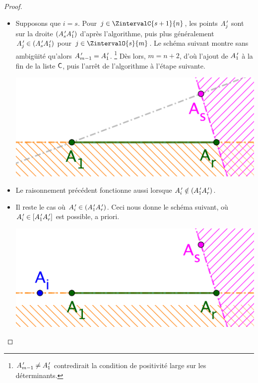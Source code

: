 \begin{proof}
\begin{itemize}
        \item Supposons que $i = s$. 
        Pour $j \in \ZintervalC{s+1}{n}$, les points $A^{\,\prime}_j$ sont sur la droite $( A^{\,\prime}_s A^{\,\prime}_1)$ d'après l'algorithme, 
        puis plus généralement $A^{\,\prime}_j \in ( A^{\,\prime}_s A^{\,\prime}_1)$ pour $j \in \ZintervalO{s}{m}$. 
        Le schéma suivant montre sans ambigüité qu'alors
        $A^{\,\prime}_{m-1} = A^{\,\prime}_1$.%
        \footnote{
            $A^{\,\prime}_{m-1} \neq A^{\,\prime}_1$ contredirait la condition de positivité large sur les déterminants.
        }
        Dès lors, $m = n+2$, d'où l'ajout de $A^{\,\prime}_1$ à la fin de la liste $\mathsf{C}$, puis l'arrêt de l'algorithme à l'étape suivante.
        \begin{center}
        	\includegraphics[scale=.2]{content/polygon/at-least-one/algo-kgone-terminate-1.png}
        \end{center}


        \item Le raisonnement précédent fonctionne aussi lorsque $A^{\,\prime}_i \notin (A^{\,\prime}_1 A^{\,\prime}_r)$.


        \item Il reste le cas où $A^{\,\prime}_i \in (A^{\,\prime}_1 A^{\,\prime}_r)$.
       	Ceci nous donne le schéma suivant, où
       	$A^{\,\prime}_i \in [A^{\,\prime}_1 A^{\,\prime}_r]$ est possible, a priori. 
        \begin{center}
        	\includegraphics[scale=.2]{content/polygon/at-least-one/algo-kgone-terminate-2.png}
        \end{center}
        

\end{itemize}
\end{proof}
